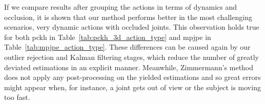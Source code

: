 \begin{table}[!ht]  
  \centering
  \caption{Quantitative 3D pose estimation results on BMHAD per action, using as figure of merit PCKh~3D~@~1~(\%). Values in bold correspond to the best results achieved for each category. Columns are colored following the convention established in Section~\ref{sec:benchmark_dataset}.}
  \label{tab:pckh_3d_action}
\end{table}

If we compare results after grouping the actions in terms of dynamics and occlusion, it is shown that our method performs better in the most challenging scenarios, \ie very dynamic actions with occluded joints. This observation holds true for both \gls{pckh} in Table~\ref{tab:pckh_3d_action_type} and \gls{mpjpe} in Table~\ref{tab:mpjpe_action_type}. These differences can be caused again by our outlier rejection and Kalman filtering stages, which reduce the number of greatly deviated estimations in an explicit manner. Meanwhile, Zimmermann's method does not apply any post-processing on the yielded estimations and so great errors might appear when, for instance, a joint gets out of view or the subject is moving too fast. 

